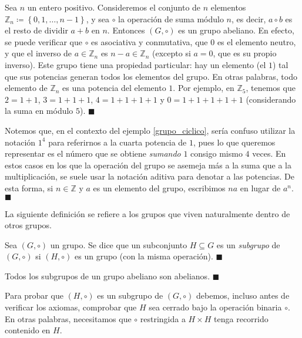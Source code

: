 \begin{example} \label{grupo_ciclico}
Sea $n$ un entero positivo. Consideremos el conjunto de $n$ elementos $\mathbb{Z}_n \coloneq \left\{ 0, 1, \dots, n-1 \right\}$, y sea $\circ$ la operación de suma módulo $n$, es decir, $a \circ b$ es el resto de dividir $a+b$ en $n$. Entonces $(G, \circ)$ es un grupo abeliano. En efecto, se puede verificar que $\circ$ es asociativa y conmutativa, que $0$ es el elemento neutro, y que el inverso de $a \in \mathbb{Z}_n$ es $n-a \in \mathbb{Z}_n$ (excepto si $a = 0$, que es su propio inverso).
Este grupo tiene una propiedad particular: hay un elemento (el $1$) tal que sus potencias generan todos los elementos del grupo. En otras palabras, todo elemento de $\mathbb{Z}_n$ es una potencia del elemento $1$. Por ejemplo, en $\mathbb{Z}_5$, tenemos que $2 = 1 + 1$, $3 = 1 + 1 + 1$, $4 = 1 + 1 + 1 + 1$ y $0 = 1 + 1 + 1 + 1 + 1$ (considerando la suma en módulo $5$).
\hfill$\blacksquare$
\end{example}

\begin{remark} Notemos que, en el contexto del ejemplo \ref{grupo_ciclico}, sería confuso utilizar la notación $1^4$ para referirnos a la cuarta potencia de $1$, pues lo que queremos representar es el número que se obtiene \textit{sumando} $1$ consigo mismo $4$ veces. En estos casos en los que la operación del grupo se asemeja más a la suma que a la multiplicación, se suele usar la notación aditiva para denotar a las potencias. De esta forma, si $n \in \mathbb{Z}$ y $a$ es un elemento del grupo, escribimos $n a$ en lugar de $a^n$. \hfill$\blacksquare$
\end{remark}


La siguiente definición se refiere a los grupos que viven naturalmente dentro de otros grupos.

\begin{definition}[Subgrupo]
Sea $(G,\circ)$ un grupo. Se dice que un subconjunto $H \subseteq G$ es un \emph{subgrupo} de $(G,\circ)$ si $(H, \circ)$ es un grupo (con la misma operación). \hfill$\blacksquare$
\end{definition}

\begin{remark}
	Todos los subgrupos de un grupo abeliano son abelianos. \hfill$\blacksquare$
	\end{remark}

Para probar que $(H, \circ)$ es un subgrupo de $(G, \circ)$ debemos, incluso antes de verificar los axiomas, comprobar que $H$ sea cerrado bajo la operación binaria $\circ$. En otras palabras, necesitamos que $\circ$ restringida a $H \times H$ tenga recorrido contenido en $H$. 


